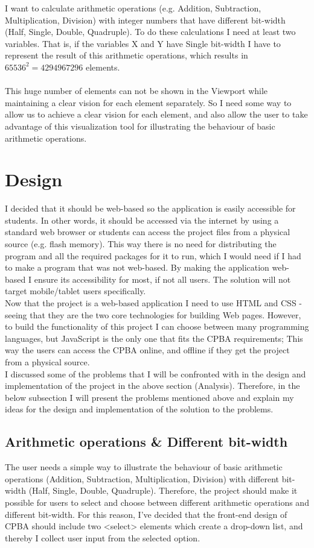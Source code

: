 \documentclass[11pt]{article}
\begin{document}
I want to calculate arithmetic operations (e.g. Addition, Subtraction, Multiplication, Division) with integer numbers that have different bit-width (Half, Single, Double, Quadruple). To do these calculations I need at least two variables. That is, if the variables X and Y have Single bit-width I have to represent the result of this arithmetic operations, which results in $65536^{2} = 4294967296$ elements.\\\\
This huge number of elements can not be shown in the Viewport while maintaining a clear vision for each element separately. So I need some way to allow us to achieve a clear vision for each element, and also allow the user to take advantage of this visualization tool for illustrating the behaviour of basic arithmetic operations.\\
\section{Design}
I decided that it should be web-based so the application is easily accessible for students. In other words, it should be accessed via the internet by using a standard web browser or students can access the project files from a physical source (e.g. flash memory). This way there is no need for distributing the program and all the required packages for it to run, which I would need if I had to make a program that was not web-based. By making the application web-based I ensure its accessibility for most, if not all users.
The solution will not target mobile/tablet users specifically.\\

Now that the project is a web-based application I need to use HTML and CSS - seeing that they are the two core technologies for building Web pages. However, to build the functionality of this project I can choose between many programming languages, but JavaScript is the only one that fits the CPBA requirements; This way the users can access the CPBA online, and offline if they get the project from a physical source.\\

I discussed some of the problems that I will be confronted with in the design and implementation of the project in the above section (Analysis). Therefore, in the below subsection I will present the problems mentioned above and explain my ideas for the design and implementation of the solution to the problems.
\subsection{Arithmetic operations \& Different bit-width}
The user needs a simple way to illustrate the behaviour of basic arithmetic operations (Addition, Subtraction, Multiplication, Division) with different bit-width (Half, Single, Double, Quadruple). Therefore, the project should make it possible for users to select and choose between different arithmetic operations and different bit-width. For this reason, I've decided that the front-end design of CPBA should include  two  <select> elements which create a drop-down list, and thereby I collect user input from the selected option.
\end{document}
